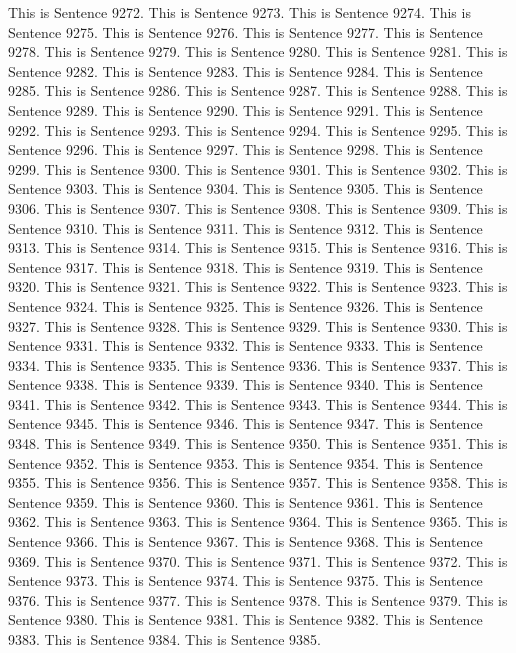 \documentclass{article}
\begin{document}
This is Sentence 9272.
This is Sentence 9273.
This is Sentence 9274.
This is Sentence 9275.
This is Sentence 9276.
This is Sentence 9277.
This is Sentence 9278.
This is Sentence 9279.
This is Sentence 9280.
This is Sentence 9281.
This is Sentence 9282.
This is Sentence 9283.
This is Sentence 9284.
This is Sentence 9285.
This is Sentence 9286.
This is Sentence 9287.
This is Sentence 9288.
This is Sentence 9289.
This is Sentence 9290.
This is Sentence 9291.
This is Sentence 9292.
This is Sentence 9293.
This is Sentence 9294.
This is Sentence 9295.
This is Sentence 9296.
This is Sentence 9297.
This is Sentence 9298.
This is Sentence 9299.
This is Sentence 9300.
This is Sentence 9301.
This is Sentence 9302.
This is Sentence 9303.
This is Sentence 9304.
This is Sentence 9305.
This is Sentence 9306.
This is Sentence 9307.
This is Sentence 9308.
This is Sentence 9309.
This is Sentence 9310.
This is Sentence 9311.
This is Sentence 9312.
This is Sentence 9313.
This is Sentence 9314.
This is Sentence 9315.
This is Sentence 9316.
This is Sentence 9317.
This is Sentence 9318.
This is Sentence 9319.
This is Sentence 9320.
This is Sentence 9321.
This is Sentence 9322.
This is Sentence 9323.
This is Sentence 9324.
This is Sentence 9325.
This is Sentence 9326.
This is Sentence 9327.
This is Sentence 9328.
This is Sentence 9329.
This is Sentence 9330.
This is Sentence 9331.
This is Sentence 9332.
This is Sentence 9333.
This is Sentence 9334.
This is Sentence 9335.
This is Sentence 9336.
This is Sentence 9337.
This is Sentence 9338.
This is Sentence 9339.
This is Sentence 9340.
This is Sentence 9341.
This is Sentence 9342.
This is Sentence 9343.
This is Sentence 9344.
This is Sentence 9345.
This is Sentence 9346.
This is Sentence 9347.
This is Sentence 9348.
This is Sentence 9349.
This is Sentence 9350.
This is Sentence 9351.
This is Sentence 9352.
This is Sentence 9353.
This is Sentence 9354.
This is Sentence 9355.
This is Sentence 9356.
This is Sentence 9357.
This is Sentence 9358.
This is Sentence 9359.
This is Sentence 9360.
This is Sentence 9361.
This is Sentence 9362.
This is Sentence 9363.
This is Sentence 9364.
This is Sentence 9365.
This is Sentence 9366.
This is Sentence 9367.
This is Sentence 9368.
This is Sentence 9369.
This is Sentence 9370.
This is Sentence 9371.
This is Sentence 9372.
This is Sentence 9373.
This is Sentence 9374.
This is Sentence 9375.
This is Sentence 9376.
This is Sentence 9377.
This is Sentence 9378.
This is Sentence 9379.
This is Sentence 9380.
This is Sentence 9381.
This is Sentence 9382.
This is Sentence 9383.
This is Sentence 9384.
This is Sentence 9385.
\end{document}
